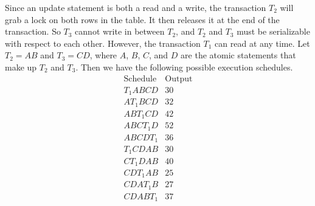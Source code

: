 \documentclass[12pt]{article}
\begin{document}
Since an update statement is both a read and a write, the transaction \(T_2\) will grab a lock on both rows in the table. It then releases it at the
end of the transaction. So \(T_3\) cannot write in between \(T_2\), and \(T_2\) and \(T_3\) must be serializable with respect to each other.
However, the transaction \(T_1\) can read at any time. Let \(T_2=AB\) and \(T_3=CD\), where \(A\), \(B\), \(C\), and \(D\) are
the atomic statements that make up \(T_2\) and \(T_3\). Then we have the following possible execution schedules.
\[
        \begin{array}{c|c}
                \text{Schedule} & \text{Output}\\
                \hline
                T_1ABCD & 30\\
                AT_1BCD & 32\\
                ABT_1CD & 42\\
                ABCT_1D & 52\\
                ABCDT_1 & 36\\
                T_1CDAB & 30\\
                CT_1DAB & 40\\
                CDT_1AB & 25\\
                CDAT_1B & 27\\
                CDABT_1 & 37
        \end{array}
\]
\end{document}
